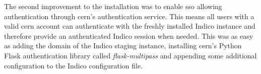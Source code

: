 The second improvement to the installation was to enable \gls{sso} allowing authentication through \gls{cern}'s authentication service. This means all users with a valid \gls{cern} account can authenticate with the freshly installed Indico instance and therefore provide an authenticated Indico session when needed. This was as easy as adding the domain of the Indico staging instance, installing \gls{cern}'s Python Flask authentication library called \textit{flask-multipass} \cite{flask-multipass} and appending some additional configuration to the Indico configuration file.
